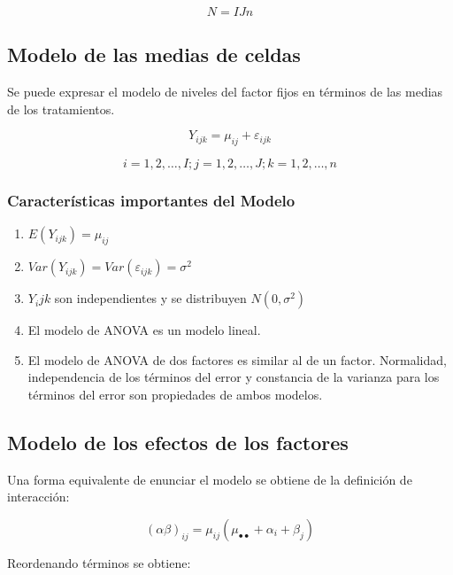 \documentclass[]{book}
\theoremstyle{definition}
\theoremstyle{definition}
\theoremstyle{definition}
\theoremstyle{remark}
\begin{document}
\[
N  =  IJn
\]

\hypertarget{modelo-de-las-medias-de-celdas}{%
\subsection{Modelo de las medias de
celdas}\label{modelo-de-las-medias-de-celdas}}

Se puede expresar el modelo de niveles del factor fijos en términos de
las medias de los tratamientos.

\[
Y_{ijk} = \mu_{ij} + \varepsilon_{ijk}
\]

\[
i = 1,2,\ldots,I;j = 1,2,\ldots,J;k = 1,2,\ldots,n
\]

\hypertarget{caracteristicas-importantes-del-modelo-2}{%
\subsubsection{Características importantes del
Modelo}\label{caracteristicas-importantes-del-modelo-2}}

\begin{enumerate}
\def\labelenumi{\arabic{enumi}.}
\item
  \(E(Y_{ijk}) = \mu_{ij}\)
\item
  \(Var(Y_{ijk}) = Var(\varepsilon_{ijk}) = \sigma^{2}\)
\item
  \(Y_ijk\) son independientes y se distribuyen
  \(N\left( 0,\sigma^{2} \right)\)
\item
  El modelo de ANOVA es un modelo lineal.
\item
  El modelo de ANOVA de dos factores es similar al de un factor.
  Normalidad, independencia de los términos del error y constancia de la
  varianza para los términos del error son propiedades de ambos modelos.
\end{enumerate}

\hypertarget{modelo-de-los-efectos-de-los-factores}{%
\subsection{Modelo de los efectos de los
factores}\label{modelo-de-los-efectos-de-los-factores}}

Una forma equivalente de enunciar el modelo se obtiene de la definición
de interacción:

\[
\left( \alpha\beta \right)_{ij} = \mu_{ij}(\mu_{\bullet \bullet} + \alpha_{i} + \beta_{j})
\]

Reordenando términos se obtiene:
\end{document}
